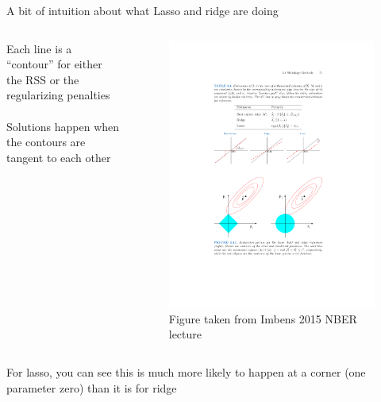\documentclass[mathserif, aspectratio=169]{beamer}
\begin{document}
\begin{frame}{A bit of intuition about what Lasso and ridge are doing}
\begin{columns}
Each line is a ``contour'' for either the RSS or the regularizing penalties\\~\\

Solutions happen when the contours are tangent to each other
\begin{figure}
\includegraphics[scale=0.6]{lasso_v_ridge}
\caption*{\tiny Figure taken from Imbens 2015 NBER lecture}
\end{figure}
\end{columns}

\vspace{5mm}

For lasso, you can see this is much more likely to happen at a corner (one parameter zero) than it is for ridge
\end{frame}
\end{document}
